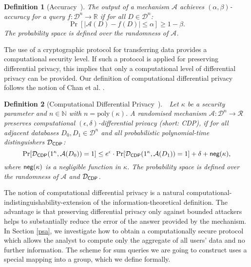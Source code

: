 \documentclass[10pt]{extarticle}
\newtheorem{Def}{Definition}
\begin{document}
\begin{Def}[Accuracy~\cite{17}]
The output of a mechanism $\mathcal{A}$ achieves $(\alpha,\beta)$-accuracy for a query $f:\mathcal{D}^n\to\mathbb{R}$ if for all $D\in\mathcal{D}^n$:
\[\Pr[|\mathcal{A}(D)-f(D)|\leq\alpha]\geq 1-\beta.\]
The probability space is defined over the randomness of $\mathcal{A}$.
\end{Def}

The use of a cryptographic protocol for transferring data provides a computational security level. If such a protocol is applied for preserving differential privacy, this implies that only a computational level of differential privacy can be provided. Our definition of computational differential privacy follows the notion of Chan et al. \cite{3}.

\begin{Def}[Computational Differential Privacy~\cite{3}] 
\mbox{\,\,} Let $\kappa$ be a security parameter and $n\in\mathbb{N}$ with $n=\text{poly}(\kappa)$. A randomised mechanism $\mathcal{A}:\mathcal{D}^n\to\mathcal{R}$ preserves computational $(\epsilon,\delta)$-differential privacy (short: \mbox{\upshape\sffamily CDP}), if for all adjacent databases $D_0, D_1\in\mathcal{D}^n$ and all probabilistic polynomial-time distinguishers $\mathcal{D}_{\mbox{\scriptsize\upshape\sffamily CDP}}$:
\[\Pr[\mathcal{D}_{\mbox{\scriptsize\upshape\sffamily CDP}}(1^\kappa,\mathcal{A}(D_0))=1]\leq e^\epsilon\cdot\Pr[\mathcal{D}_{\mbox{\scriptsize\upshape\sffamily CDP}}(1^\kappa,\mathcal{A}(D_1))=1]+\delta+\text{\upshape\sffamily neg}(\kappa),\]
where $\text{\upshape\sffamily neg}(\kappa)$ is a negligible function in $\kappa$. The probability space is defined over the randomness of $\mathcal{A}$ and $\mathcal{D}_{\mbox{\scriptsize\upshape\sffamily CDP}}$.
\end{Def}

The notion of computational differential privacy is a natural computational-\linebreak indistinguishability-extension of the infor\-mation-theoretical definition. The advantage is that preserving differential privacy only against bounded attackers helps to substantially reduce the error of the answer provided by the mechanism. In Section \ref{psa}, we investigate how to obtain a computationally secure protocol which allows the analyst to compute only the aggregate of all users' data and no further information. The scheme for sum queries we are going to construct uses a special mapping into a group, which we define formally.
\end{document}
